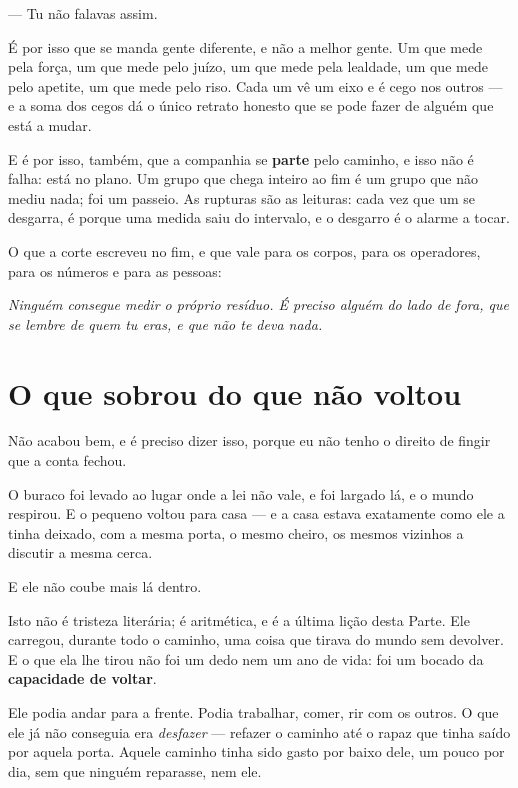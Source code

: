 \documentclass[livro.tex]{subfiles}
\begin{document}
--- Tu não falavas assim.

\medskip

É por isso que se manda gente diferente, e não a melhor gente. Um que mede pela força, um
que mede pelo juízo, um que mede pela lealdade, um que mede pelo apetite, um que mede pelo
riso. Cada um vê um eixo e é cego nos outros --- e a soma dos cegos dá o único retrato
honesto que se pode fazer de alguém que está a mudar.

E é por isso, também, que a companhia se \textbf{parte} pelo caminho, e isso não é falha:
está no plano. Um grupo que chega inteiro ao fim é um grupo que não mediu nada; foi um
passeio. As rupturas são as leituras: cada vez que um se desgarra, é porque uma medida
saiu do intervalo, e o desgarro é o alarme a tocar.

\medskip

O que a corte escreveu no fim, e que vale para os corpos, para os operadores, para os
números e para as pessoas:

\emph{Ninguém consegue medir o próprio resíduo. É preciso alguém do lado de fora, que se
lembre de quem tu eras, e que não te deva nada.}

\section{O que sobrou do que não voltou}

Não acabou bem, e é preciso dizer isso, porque eu não tenho o direito de fingir que
a conta fechou.

O buraco foi levado ao lugar onde a lei não vale, e foi largado lá, e o mundo respirou. E
o pequeno voltou para casa --- e a casa estava exatamente como ele a tinha deixado, com a
mesma porta, o mesmo cheiro, os mesmos vizinhos a discutir a mesma cerca.

E ele não coube mais lá dentro.

\medskip

Isto não é tristeza literária; é aritmética, e é a última lição desta Parte. Ele carregou,
durante todo o caminho, uma coisa que tirava do mundo sem devolver. E o que ela lhe tirou
não foi um dedo nem um ano de vida: foi um bocado da \textbf{capacidade de voltar}.

Ele podia andar para a frente. Podia trabalhar, comer, rir com os outros. O que ele já não
conseguia era \emph{desfazer} --- refazer o caminho até o rapaz que tinha saído por aquela
porta. Aquele caminho tinha sido gasto por baixo dele, um pouco por dia, sem que ninguém
reparasse, nem ele.
\end{document}
